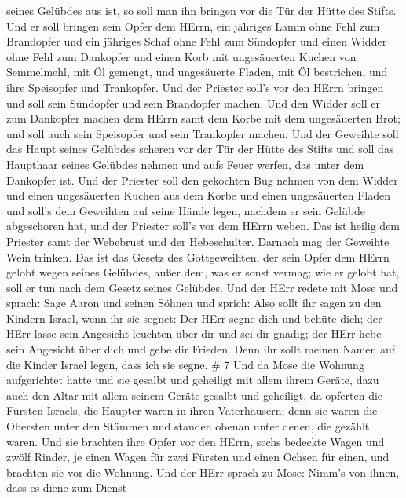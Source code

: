 seines Gelübdes aus ist, so soll man ihn bringen vor die Tür der Hütte
des Stifts.  Und er soll bringen sein Opfer dem HErrn, ein
jähriges Lamm ohne Fehl zum Brandopfer und ein jähriges Schaf ohne Fehl
zum Sündopfer und einen Widder ohne Fehl zum Dankopfer  und
einen Korb mit ungesäuerten Kuchen von Semmelmehl, mit Öl gemengt, und
ungesäuerte Fladen, mit Öl bestrichen, und ihre Speisopfer und
Trankopfer.  Und der Priester soll's vor den HErrn bringen
und soll sein Sündopfer und sein Brandopfer machen.  Und
den Widder soll er zum Dankopfer machen dem HErrn samt dem Korbe mit dem
ungesäuerten Brot; und soll auch sein Speisopfer und sein Trankopfer
machen.  Und der Geweihte soll das Haupt seines Gelübdes
scheren vor der Tür der Hütte des Stifts und soll das Haupthaar seines
Gelübdes nehmen und aufs Feuer werfen, das unter dem Dankopfer ist.
 Und der Priester soll den gekochten Bug nehmen von dem
Widder und einen ungesäuerten Kuchen aus dem Korbe und einen
ungesäuerten Fladen und soll's dem Geweihten auf seine Hände legen,
nachdem er sein Gelübde abgeschoren hat,  und der Priester
soll's vor dem HErrn weben. Das ist heilig dem Priester samt der
Webebrust und der Hebeschulter. Darnach mag der Geweihte Wein trinken.
 Das ist das Gesetz des Gottgeweihten, der sein Opfer dem
HErrn gelobt wegen seines Gelübdes, außer dem, was er sonst vermag; wie
er gelobt hat, soll er tun nach dem Gesetz seines Gelübdes.
 Und der HErr redete mit Mose und sprach: 
Sage Aaron und seinen Söhnen und sprich: Also sollt ihr sagen zu den
Kindern Israel, wenn ihr sie segnet:  Der HErr segne dich
und behüte dich;  der HErr lasse sein Angesicht leuchten
über dir und sei dir gnädig;  der HErr hebe sein Angesicht
über dich und gebe dir Frieden.  Denn ihr sollt meinen
Namen auf die Kinder Israel legen, dass ich sie segne. \# 7 
Und da Mose die Wohnung aufgerichtet hatte und sie gesalbt und geheiligt
mit allem ihrem Geräte, dazu auch den Altar mit allem seinem Geräte
gesalbt und geheiligt,  da opferten die Fürsten Israels, die
Häupter waren in ihren Vaterhäusern; denn sie waren die Obersten unter
den Stämmen und standen obenan unter denen, die gezählt waren.
 Und sie brachten ihre Opfer vor den HErrn, sechs bedeckte
Wagen und zwölf Rinder, je einen Wagen für zwei Fürsten und einen Ochsen
für einen, und brachten sie vor die Wohnung.  Und der HErr
sprach zu Mose:  Nimm's von ihnen, dass es diene zum Dienst
